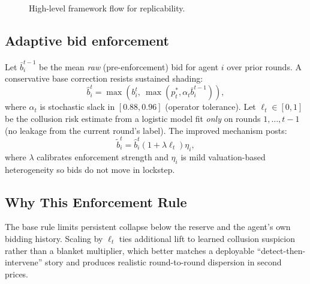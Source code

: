 \documentclass[journal]{IEEEtran}
\begin{document}
\begin{figure}[t]
\centering
{}
\caption{High-level framework flow for replicability.}
\label{fig:flow}
\end{figure}

\subsection{Adaptive bid enforcement}
Let $\bar{b}_i^{t-1}$ be the mean \emph{raw} (pre-enforcement) bid for agent $i$ over prior rounds. A conservative base correction resists sustained shading:
\begin{equation}
\hat{b}_i^t = \max\left(b_i^t,\ \max\left(p_t^\ast, \alpha_t \bar{b}_i^{t-1}\right)\right),
\end{equation}
where $\alpha_t$ is stochastic slack in $[0.88, 0.96]$ (operator tolerance). Let $\ell_t \in [0,1]$ be the collusion risk estimate from a logistic model fit \emph{only} on rounds $1,\ldots,t-1$ (no leakage from the current round's label). The improved mechanism posts:
\begin{equation}
\tilde{b}_i^t = \hat{b}_i^t \left(1 + \lambda \ell_t\right) \eta_i,
\end{equation}
where $\lambda$ calibrates enforcement strength and $\eta_i$ is mild valuation-based heterogeneity so bids do not move in lockstep.

\subsection{Why This Enforcement Rule}
The base rule limits persistent collapse below the reserve and the agent's own bidding history. Scaling by $\ell_t$ ties additional lift to learned collusion suspicion rather than a blanket multiplier, which better matches a deployable ``detect-then-intervene'' story and produces realistic round-to-round dispersion in second prices.
\end{document}
